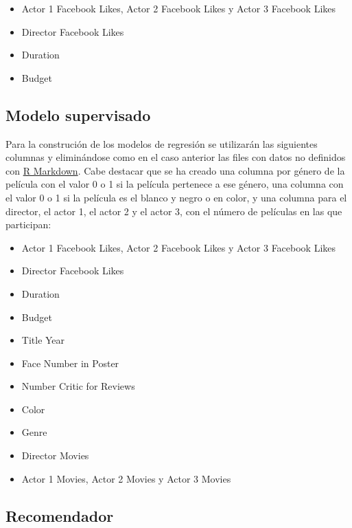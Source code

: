\documentclass{article}
\begin{document}
\begin{itemize}
  \item Actor 1 Facebook Likes, Actor 2 Facebook Likes y Actor 3 Facebook Likes 
  \item Director Facebook Likes
  \item Duration
  \item Budget
\end{itemize}

\subsection{Modelo supervisado}

Para la construción de los modelos de regresión se utilizarán las siguientes columnas y eliminándose como en el caso anterior las files con datos no definidos con \href{https://github.com/pozueco/proyecto_fin_de_master/blob/master/clean_dataset.md}{R Markdown}. Cabe destacar que se ha creado una columna por género de la película con el valor 0 o 1 si la película pertenece a ese género, una columna con el valor 0 o 1 si la película es el blanco y negro o en color, y una columna para el director, el actor 1, el actor 2 y el actor 3, con el número de películas en las que participan:

\begin{itemize}
  \item Actor 1 Facebook Likes, Actor 2 Facebook Likes y Actor 3 Facebook Likes
  \item Director Facebook Likes
  \item Duration
  \item Budget
  \item Title Year
  \item Face Number in Poster
  \item Number Critic for Reviews
  \item Color
  \item Genre
  \item Director Movies
  \item Actor 1 Movies, Actor 2 Movies y Actor 3 Movies
  \end{itemize}

\clearpage

\subsection{Recomendador}

\blindtext

\clearpage
\end{document}
